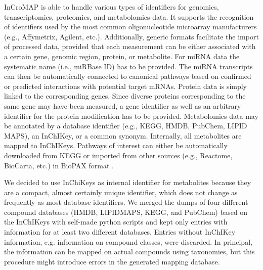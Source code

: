 \documentclass[final,5p,times,twocolumn]{elsarticle}
\begin{document}
InCroMAP is able to handle various types of identifiers for genomics, transcriptomics, proteomics, and metabolomics data. It supports the recognition of identifiers used by the most common oligonucleotide microarray manufacturers (e.g., Affymetrix, Agilent, etc.). Additionally, generic formats facilitate the import of processed data, provided that each measurement can be either associated with a certain gene, genomic region, protein, or metabolite. For miRNA data the systematic name (i.e., miRBase ID) has to be provided. The miRNA transcripts can then be automatically connected to canonical pathways based on confirmed or predicted interactions with potential target mRNAs. Protein data is simply linked to the corresponding genes. Since diverse proteins corresponding to the same gene may have been measured, a gene identifier as well as an arbitrary identifier for the protein modification has to be provided. Metabolomics data may be annotated by a database identifier (e.g., KEGG, HMDB, PubChem, LIPID MAPS), an InChIKey, or a common synonym. Internally, all metabolites are mapped to InChIKeys. Pathways of interest can either be automatically downloaded from KEGG or imported from other sources (e.g., Reactome, BioCarta, etc.) in BioPAX format \cite{Eustachio2011}.

We decided to use InChiKeys as internal identifier for metabolites because they are a compact, almost certainly unique identifier, which does not change as frequently as most database identifiers. We merged the dumps of four different compound databases (HMDB, LIPIDMAPS, KEGG, and PubChem) based on the InChIKeys with self-made python scripts and kept only entries with information for at least two different databases. Entries without InChIKey information, e.g. information on compound classes,  were discarded. In principal, the information can be mapped on actual compounds using taxonomies, but this procedure might introduce errors in the generated mapping database.
\end{document}
